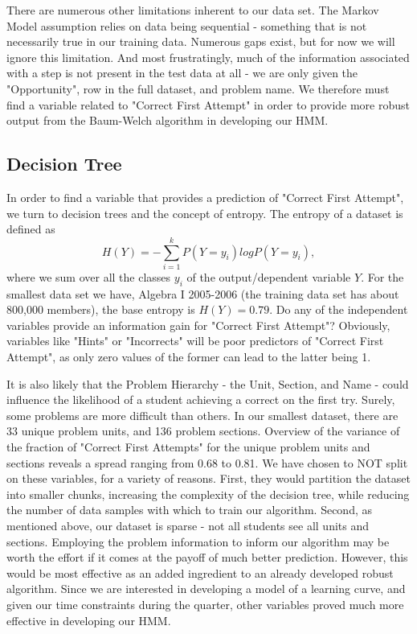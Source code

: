 \documentclass{article} %
\begin{document}
There are numerous other limitations inherent to our data set. The Markov Model assumption relies on data being sequential - something that is not necessarily true in our training data. Numerous gaps exist, but for now we will ignore this limitation. And most frustratingly, much of the information associated with a step is not present in the test data at all - we are only given the "Opportunity", row in the full dataset, and problem name. We therefore must find a variable related to "Correct First Attempt" in order to provide more robust output from the Baum-Welch algorithm in developing our HMM.

\subsection{Decision Tree}
In order to find a variable that provides a prediction of "Correct First Attempt", we turn to decision trees and the concept of entropy. The entropy of a dataset is defined as
$$
H(Y) = -\sum_{i=1}^k P(Y = y_i) log P(Y = y_i),
$$
where we sum over all the classes $y_i$ of the output/dependent variable $Y$. For the smallest data set we have, Algebra I 2005-2006 (the training data set has about 800,000 members), the base entropy is $H(Y) = 0.79$. Do any of the independent variables provide an information gain for "Correct First Attempt"? Obviously, variables like "Hints" or "Incorrects" will be poor predictors of "Correct First Attempt", as only zero values of the former can lead to the latter being 1.

It is also likely that the Problem Hierarchy - the Unit, Section, and Name - could influence the likelihood of a student achieving a correct on the first try. Surely, some problems are more difficult than others. In our smallest dataset, there are 33 unique problem units, and 136 problem sections. Overview of the variance of the fraction of "Correct First Attempts" for the unique problem units and sections reveals a spread ranging from 0.68 to 0.81. We have chosen to NOT split on these variables, for a variety of reasons. First, they would partition the dataset into smaller chunks, increasing the complexity of the decision tree, while reducing the number of data samples with which to train our algorithm. Second, as mentioned above, our dataset is sparse - not all students see all units and sections. Employing the problem information to inform our algorithm may be worth the effort if it comes at the payoff of much better prediction. However, this would be most effective as an added ingredient to an already developed robust algorithm. Since we are interested in developing a model of a learning curve, and given our time constraints during the quarter, other variables proved much more effective in developing our HMM.
\end{document}
